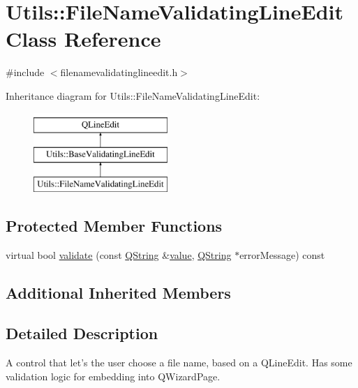 \hypertarget{class_utils_1_1_file_name_validating_line_edit}{\section{Utils\-:\-:File\-Name\-Validating\-Line\-Edit Class Reference}
\label{class_utils_1_1_file_name_validating_line_edit}
}


{\ttfamily \#include $<$filenamevalidatinglineedit.\-h$>$}

Inheritance diagram for Utils\-:\-:File\-Name\-Validating\-Line\-Edit\-:\begin{figure}[H]
\begin{center}
\leavevmode
\includegraphics[height=3.000000cm]{class_utils_1_1_file_name_validating_line_edit}
\end{center}
\end{figure}
\subsection*{Protected Member Functions}
\begin{DoxyCompactItemize}
\item 
virtual bool \hyperlink{class_utils_1_1_file_name_validating_line_edit_a6ba8ad815a56a23c6ffde57188e4c73a}{validate} (const \hyperlink{group___u_a_v_objects_plugin_gab9d252f49c333c94a72f97ce3105a32d}{Q\-String} \&\hyperlink{glext_8h_aa0e2e9cea7f208d28acda0480144beb0}{value}, \hyperlink{group___u_a_v_objects_plugin_gab9d252f49c333c94a72f97ce3105a32d}{Q\-String} $\ast$error\-Message) const 
\end{DoxyCompactItemize}
\subsection*{Additional Inherited Members}


\subsection{Detailed Description}
A control that let's the user choose a file name, based on a Q\-Line\-Edit. Has some validation logic for embedding into Q\-Wizard\-Page. 

